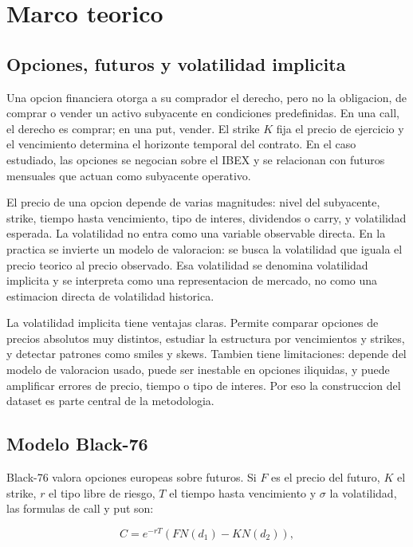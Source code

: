 \chapter{Marco teorico}
\label{chap:marco}

\section{Opciones, futuros y volatilidad implicita}

Una opcion financiera otorga a su comprador el derecho, pero no la obligacion, de comprar o vender un activo subyacente en condiciones predefinidas. En una call, el derecho es comprar; en una put, vender. El strike $K$ fija el precio de ejercicio y el vencimiento determina el horizonte temporal del contrato. En el caso estudiado, las opciones se negocian sobre el IBEX y se relacionan con futuros mensuales que actuan como subyacente operativo.

El precio de una opcion depende de varias magnitudes: nivel del subyacente, strike, tiempo hasta vencimiento, tipo de interes, dividendos o carry, y volatilidad esperada. La volatilidad no entra como una variable observable directa. En la practica se invierte un modelo de valoracion: se busca la volatilidad que iguala el precio teorico al precio observado. Esa volatilidad se denomina volatilidad implicita y se interpreta como una representacion de mercado, no como una estimacion directa de volatilidad historica.

La volatilidad implicita tiene ventajas claras. Permite comparar opciones de precios absolutos muy distintos, estudiar la estructura por vencimientos y strikes, y detectar patrones como smiles y skews. Tambien tiene limitaciones: depende del modelo de valoracion usado, puede ser inestable en opciones iliquidas, y puede amplificar errores de precio, tiempo o tipo de interes. Por eso la construccion del dataset es parte central de la metodologia.

\section{Modelo Black-76}

Black-76 valora opciones europeas sobre futuros. Si $F$ es el precio del futuro, $K$ el strike, $r$ el tipo libre de riesgo, $T$ el tiempo hasta vencimiento y $\sigma$ la volatilidad, las formulas de call y put son:

\[
C=e^{-rT}\left(FN(d_1)-KN(d_2)\right),
\]

